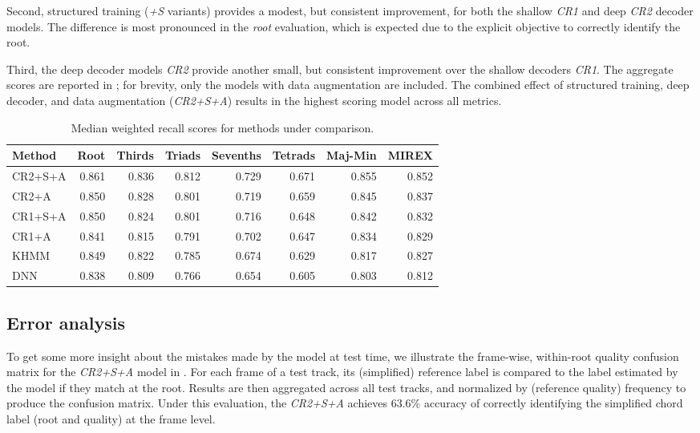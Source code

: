 \documentclass{article}
\begin{document}
Second, structured training (\emph{+S} variants) provides a modest, but consistent improvement, for both the shallow \emph{CR1} and deep \emph{CR2} decoder models.
The difference is most pronounced in the \emph{root} evaluation, which is expected due to the explicit objective to correctly identify the root.

Third, the deep decoder models \emph{CR2} provide another small, but consistent improvement over the shallow decoders \emph{CR1}.
The aggregate scores are reported in ; for brevity, only the models with data augmentation are included.
The combined effect of structured training, deep decoder, and data augmentation (\emph{CR2+S+A}) results in the highest scoring model across all metrics.

\begin{table}
    \centering
    \small
    \begin{tabular}{lrrrrrrr}
        \toprule
        Method  & Root & Thirds & Triads & Sevenths & Tetrads & Maj-Min & MIREX\\
        \midrule
        CR2+S+A & 0.861 & 0.836 & 0.812 & 0.729 & 0.671 & 0.855 & 0.852\\
        CR2+A   & 0.850 & 0.828 & 0.801 & 0.719 & 0.659 & 0.845 & 0.837\\
        CR1+S+A & 0.850 & 0.824 & 0.801 & 0.716 & 0.648 & 0.842 & 0.832\\
        CR1+A   & 0.841 & 0.815 & 0.791 & 0.702 & 0.647 & 0.834 & 0.829\\
        \midrule
        KHMM~\cite{cho2014improved}    & 0.849 & 0.822 & 0.785 & 0.674 & 0.629 & 0.817 & 0.827\\
        DNN~\cite{humphrey2015four}     & 0.838 & 0.809 & 0.766 & 0.654 & 0.605 & 0.803 & 0.812\\
        \bottomrule
    \end{tabular}
    \normalsize
    \caption{Median weighted recall scores for methods under comparison.\label{tab:results}}
\end{table}
\subsection{Error analysis}

To get some more insight about the mistakes made by the model at test time, we illustrate the frame-wise, within-root quality confusion matrix for the \emph{CR2+S+A} model in .
For each frame of a test track, its (simplified) reference label is compared to the label estimated by the model if they match at the root.
Results are then aggregated across all test tracks, and normalized by (reference quality) frequency to produce the confusion matrix.
Under this evaluation, the \emph{CR2+S+A} achieves 63.6\% accuracy of correctly identifying the simplified chord label (root and quality) at the frame level.
\end{document}
